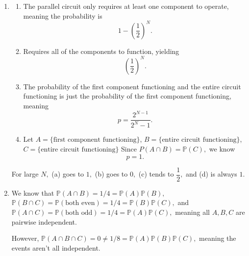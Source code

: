 \documentclass[12pt]{article}
\begin{document}
\begin{enumerate}
  \item
    \begin{enumerate}
      \item The parallel circuit only requires at least one component
        to operate, meaning the probability is $$1 -
        \left(\frac{1}{2}\right)^N.$$

      \item Requires all of the components to function, yielding
        $$\left(\frac{1}{2}\right)^N.$$

      \item The probability of the first component functioning and
        the entire circuit functioning is just the probability of the
        first component functioning, meaning $$p  =\dfrac{2^{N-1}}{2^N - 1}.$$

      \item Let $A = \{\text{first component functioning}\}$, $B =
        \{\text{entire circuit functioning}\}$, $C=\{\text{entire
        circuit functioning}\}$ Since $P(A \cap B) = \mathbb P(C),$
        we know $$p = 1.$$
    \end{enumerate}

    For large $N,$ (a) goes to $1,$ (b) goes to $0,$ (c) tends to
    $\dfrac{1}{2},$ and (d) is always $1.$

  \item We know that $\mathbb P(A \cap B) = 1/4 = \mathbb P(A)
    \mathbb P(B),$ $\mathbb P(B \cap C) = \mathbb P(\text{both even})
    = 1/4 = \mathbb P(B) \mathbb P(C),$ and $\mathbb P(A \cap C) =
    \mathbb P(\text{both odd}) = 1/4 = \mathbb P(A) \mathbb P(C),$
    meaning all $A, B, C$ are pairwise independent.

    However, $\mathbb P(A \cap B \cap C) = 0 \neq 1/8 = \mathbb P(A)
    \mathbb P(B) \mathbb P(C),$ meaning the events aren't all independent.
\end{enumerate}
\end{document}
